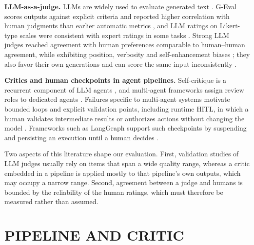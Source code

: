 \documentclass[a4paper,twoside]{article}
\begin{document}
\textbf{LLM-as-a-judge.} LLMs are widely used to evaluate generated text \cite{gu2026survey}. G-Eval scores outputs against explicit criteria and reported higher correlation with human judgments than earlier automatic metrics \cite{liu2023geval}, and LLM ratings on Likert-type scales were consistent with expert ratings in some tasks \cite{chiang2023can}. Strong LLM judges reached agreement with human preferences comparable to human--human agreement, while exhibiting position, verbosity and self-enhancement biases \cite{zheng2023judging}; they also favor their own generations \cite{panickssery2024llm} and can score the same input inconsistently \cite{stureborg2024inconsistent}.

\textbf{Critics and human checkpoints in agent pipelines.} Self-critique is a recurrent component of LLM agents \cite{shinn2023reflexion}, and multi-agent frameworks assign review roles to dedicated agents \cite{hong2024metagpt,wu2024autogen}. Failures specific to multi-agent systems \cite{cemri2025why,arunkumar2026agentic} motivate bounded loops and explicit validation points, including runtime HITL, in which a human validates intermediate results or authorizes actions without changing the model \cite{moraes2026integrating}. Frameworks such as LangGraph support such checkpoints by suspending and persisting an execution until a human decides \cite{langgraph}.

Two aspects of this literature shape our evaluation. First, validation studies of LLM judges usually rely on items that span a wide quality range, whereas a critic embedded in a pipeline is applied mostly to that pipeline's own outputs, which may occupy a narrow range. Second, agreement between a judge and humans is bounded by the reliability of the human ratings, which must therefore be measured rather than assumed.

\section{\uppercase{Pipeline and Critic}}
\label{sec:architecture}
\end{document}
